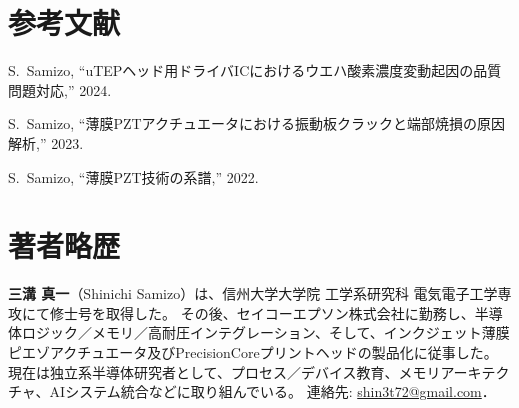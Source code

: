 \documentclass[conference]{IEEEtran}
\begin{document}
\section*{参考文献}
\begin{thebibliography}{99}
S.~Samizo, ``uTEPヘッド用ドライバICにおけるウエハ酸素濃度変動起因の品質問題対応,'' 2024.

S.~Samizo, ``薄膜PZTアクチュエータにおける振動板クラックと端部焼損の原因解析,'' 2023.

S.~Samizo, ``薄膜PZT技術の系譜,'' 2022.
\end{thebibliography}

\section*{著者略歴}
\textbf{三溝 真一}（Shinichi Samizo）は、信州大学大学院 工学系研究科 電気電子工学専攻にて修士号を取得した。  
その後、セイコーエプソン株式会社に勤務し、半導体ロジック／メモリ／高耐圧インテグレーション、そして、インクジェット薄膜ピエゾアクチュエータ及びPrecisionCoreプリントヘッドの製品化に従事した。  
現在は独立系半導体研究者として、プロセス／デバイス教育、メモリアーキテクチャ、AIシステム統合などに取り組んでいる。  
連絡先: \href{mailto:shin3t72@gmail.com}{shin3t72@gmail.com}．
\end{document}
